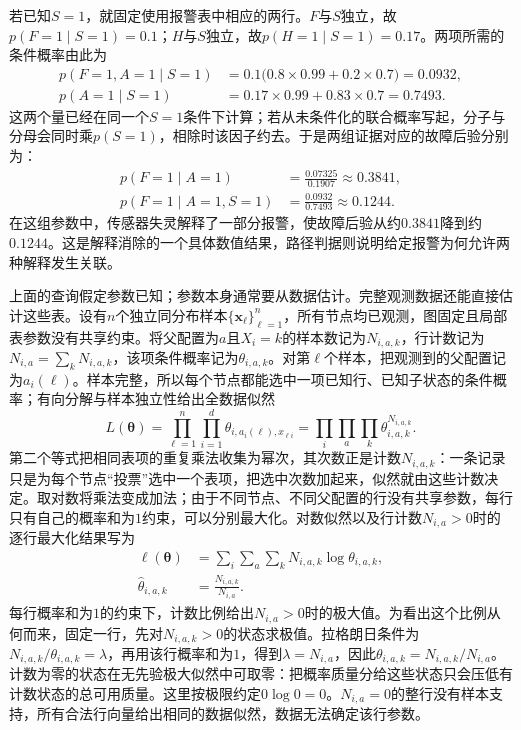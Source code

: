 若已知$S=1$，就固定使用报警表中相应的两行。$F$与$S$独立，故$p(F=1\mid S=1)=0.1$；$H$与$S$独立，故$p(H=1\mid S=1)=0.17$。两项所需的条件概率由此为
\[
  \begin{aligned}
    p(F=1,A=1\mid S=1)
      &=0.1\bigl(0.8\times0.99+0.2\times0.7\bigr)=0.0932,\\
    p(A=1\mid S=1)
      &=0.17\times0.99+0.83\times0.7=0.7493.
  \end{aligned}
\]
这两个量已经在同一个$S=1$条件下计算；若从未条件化的联合概率写起，分子与分母会同时乘$p(S=1)$，相除时该因子约去。于是两组证据对应的故障后验分别为：
\[
  \begin{aligned}
    p(F=1\mid A=1)&=\frac{0.07325}{0.1907}\approx0.3841,\\
    p(F=1\mid A=1,S=1)&=\frac{0.0932}{0.7493}\approx0.1244.
  \end{aligned}
\]
在这组参数中，传感器失灵解释了一部分报警，使故障后验从约$0.3841$降到约$0.1244$。这是解释消除的一个具体数值结果，路径判据则说明给定报警为何允许两种解释发生关联。

上面的查询假定参数已知；参数本身通常要从数据估计。完整观测数据还能直接估计这些表。设有$n$个独立同分布样本$\{\bm{x}_{\ell}\}_{\ell=1}^{n}$，所有节点均已观测，图固定且局部表参数没有共享约束。将父配置为$a$且$X_i=k$的样本数记为$N_{i,a,k}$，行计数记为$N_{i,a}=\sum_kN_{i,a,k}$，该项条件概率记为$\theta_{i,a,k}$。对第$\ell$个样本，把观测到的父配置记为$a_i(\ell)$。样本完整，所以每个节点都能选中一项已知行、已知子状态的条件概率；有向分解与样本独立性给出全数据似然
\[
  L(\bm\theta)
    =\prod_{\ell=1}^{n}\prod_{i=1}^{d}
      \theta_{i,a_i(\ell),x_{\ell i}}
    =\prod_i\prod_a\prod_k\theta_{i,a,k}^{N_{i,a,k}}.
\]
第二个等式把相同表项的重复乘法收集为幂次，其次数正是计数$N_{i,a,k}$：一条记录只是为每个节点“投票”选中一个表项，把选中次数加起来，似然就由这些计数决定。取对数将乘法变成加法；由于不同节点、不同父配置的行没有共享参数，每行只有自己的概率和为$1$约束，可以分别最大化。对数似然以及行计数$N_{i,a}>0$时的逐行最大化结果写为
\[
  \begin{aligned}
    \ell(\bm{\theta})
       &=\sum_i\sum_a\sum_kN_{i,a,k}\log\theta_{i,a,k},\\
    \widehat{\theta}_{i,a,k}&=\frac{N_{i,a,k}}{N_{i,a}}.
  \end{aligned}
\]
每行概率和为$1$的约束下，计数比例给出$N_{i,a}>0$时的极大值。为看出这个比例从何而来，固定一行，先对$N_{i,a,k}>0$的状态求极值。拉格朗日条件为$N_{i,a,k}/\theta_{i,a,k}=\lambda$，再用该行概率和为$1$，得到$\lambda=N_{i,a}$，因此$\theta_{i,a,k}=N_{i,a,k}/N_{i,a}$。计数为零的状态在无先验极大似然中可取零：把概率质量分给这些状态只会压低有计数状态的总可用质量。这里按极限约定$0\log0=0$。$N_{i,a}=0$的整行没有样本支持，所有合法行向量给出相同的数据似然，数据无法确定该行参数。

